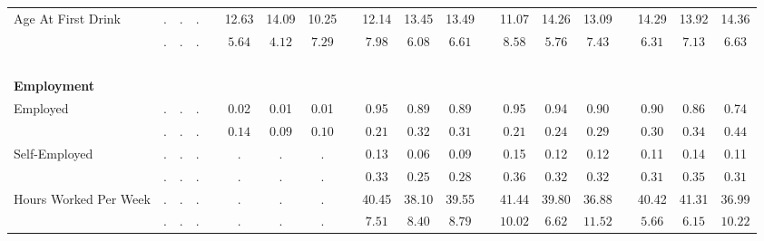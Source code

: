 \begin{center}
{\begin{longtable}{L{5cm} c c c p{.5cm} c c c p{.5cm} c c c p{.5cm} c c c p{.5cm} c c c}
 \quad Age At First Drink & . &         . &         . & &     12.63 &     14.09 &     10.25 & &     12.14 &     13.45 &     13.49 & &     11.07 &     14.26 &     13.09 & &     14.29 &     13.92 &     14.36 \\*
 \quad & $\mathit{        .}$ & $\mathit{        .}$ & $\mathit{        .}$ & & $\mathit{     5.64}$ & $\mathit{     4.12}$ & $\mathit{     7.29}$ & & $\mathit{     7.98}$ & $\mathit{     6.08}$ & $\mathit{     6.61}$ & & $\mathit{     8.58}$ & $\mathit{     5.76}$ & $\mathit{     7.43}$ & & $\mathit{     6.31}$ & $\mathit{     7.13}$ & $\mathit{     6.63}$ \\[.2em]
 ~\\[-.5em]
\textbf{Employment} \\[.6em]
 \quad Employed & . &         . &         . & &      0.02 &      0.01 &      0.01 & &      0.95 &      0.89 &      0.89 & &      0.95 &      0.94 &      0.90 & &      0.90 &      0.86 &      0.74 \\*
 \quad & $\mathit{        .}$ & $\mathit{        .}$ & $\mathit{        .}$ & & $\mathit{     0.14}$ & $\mathit{     0.09}$ & $\mathit{     0.10}$ & & $\mathit{     0.21}$ & $\mathit{     0.32}$ & $\mathit{     0.31}$ & & $\mathit{     0.21}$ & $\mathit{     0.24}$ & $\mathit{     0.29}$ & & $\mathit{     0.30}$ & $\mathit{     0.34}$ & $\mathit{     0.44}$ \\[.2em]
 \quad Self-Employed & . &         . &         . & &         . &         . &         . & &      0.13 &      0.06 &      0.09 & &      0.15 &      0.12 &      0.12 & &      0.11 &      0.14 &      0.11 \\*
 \quad & $\mathit{        .}$ & $\mathit{        .}$ & $\mathit{        .}$ & & $\mathit{        .}$ & $\mathit{        .}$ & $\mathit{        .}$ & & $\mathit{     0.33}$ & $\mathit{     0.25}$ & $\mathit{     0.28}$ & & $\mathit{     0.36}$ & $\mathit{     0.32}$ & $\mathit{     0.32}$ & & $\mathit{     0.31}$ & $\mathit{     0.35}$ & $\mathit{     0.31}$ \\[.2em]
 \quad Hours Worked Per Week & . &         . &         . & &         . &         . &         . & &     40.45 &     38.10 &     39.55 & &     41.44 &     39.80 &     36.88 & &     40.42 &     41.31 &     36.99 \\*
 \quad & $\mathit{        .}$ & $\mathit{        .}$ & $\mathit{        .}$ & & $\mathit{        .}$ & $\mathit{        .}$ & $\mathit{        .}$ & & $\mathit{     7.51}$ & $\mathit{     8.40}$ & $\mathit{     8.79}$ & & $\mathit{    10.02}$ & $\mathit{     6.62}$ & $\mathit{    11.52}$ & & $\mathit{     5.66}$ & $\mathit{     6.15}$ & $\mathit{    10.22}$ \\[.2em]

\end{longtable}}
\end{center}
